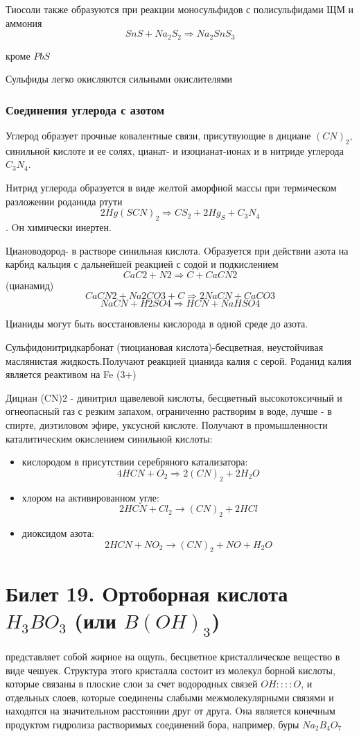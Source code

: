 \documentclass[11pt]{article}
\begin{document}
Тиосоли также образуются при реакции моносульфидов с полисульфидами ЩМ и аммония
$$SnS+Na_2S_2 \Rightarrow Na_2SnS_3$$
\begin{center}кроме $PbS$\end{center}

Сульфиды легко окисляются сильными окислителями

\subsubsection{Соединения углерода с азотом}
 
 Углерод образует прочные ковалентные связи,
присутвующие в дициане $(CN)_2$, синильной кислоте и ее солях, цианат- и изоцианат-ионах и
в нитриде углерода $C_3N_4$.

Hитрид углерода образуется в виде желтой аморфной массы при термическом
разложении роданида ртути $$2Hg(SCN)_2\Rightarrow CS_2+2Hg_S+C_3N_4$$. Oн химически инертен.

Циановодород- в растворе синильная кислота. Oбразуется при действии азота на
карбид кальция с дальнейшей реакцией с содой и подкислением
$$CaC2+N2\Rightarrow C+CaCN2$$ (цианамид) 
$$CaCN2+Na2CO3+C\Rightarrow2NaCN+CaCO3$$
$$NaCN+H2SO4 \Rightarrow HCN+NaHSO4$$

Цианиды могут быть восстановлены кислорода в одной среде до азота.

Сульфидонитридкарбонат (тиоциановая кислота)-бесцветная, неустойчивая
маслянистая жидкость.Получают реакцией цианида калия с серой. 
Роданид калия является реактивом на Fe (3+)

Дициан (CN)2 - динитрил щавелевой кислоты, бесцветный высокотоксичный и
огнеопасный газ с резким запахом, ограниченно растворим в воде, лучше - в спирте,
диэтиловом эфире, уксусной кислоте. Получают в промышленности каталитическим
окислением синильной кислоты:
\begin{itemize}
\item кислородом в присутствии серебряного катализатора:
$$4HCN+O_{2}\Rightarrow 2(CN)_{2}+2H_{2}O$$
\item хлором на активированном угле:
$$2HCN+Cl_{2}\rightarrow (CN)_{2}+2HCl$$
\item диоксидом азота:
$$2HCN+NO_{2}\rightarrow (CN)_{2}+NO+H_{2}O$$
\end{itemize}

\section{Билет 19. Oртоборная кислота $H_3BO_3$ (или $B(OH)_3$)} представляет собой жирное на ощупь, бесцветное
кристаллическое вещество в виде чешуек. Структура этого кристалла состоит из молекул
борной кислоты, которые связаны в плоские слои за счет водородных связей $OH::::O$, и
отдельных слоев, которые соединены слабыми межмолекулярными связями и находятся
на значительном расстоянии друг от друга. Oна является конечным продуктом гидролиза
растворимых соединений бора, например, буры $Na_2B_4O_7$
\end{document}

